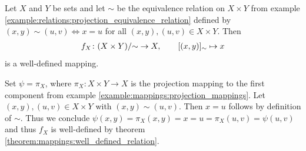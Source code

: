 \begin{examples}
    \begin{exampleenumerate}
        \item Let $X$ and $Y$ be sets and let $\sim$ be the equivalence relation on $X\times Y$ from example \ref{example:relations:projection_equivalence_relation} defined by $(x,y)\sim(u,v)\iff x=u$ for all $(x,y),(u,v)\in X\times Y$. Then
        \begin{align}f_X\colon {(X\times Y)}/{\sim} \rightarrow X,\qquad [(x,y)]_\sim\mapsto x\end{align}
        is a well-defined mapping.
        \begin{miniproof}
            Set $\psi=\pi_X$, where $\pi_X\colon X\times Y \to X$ is the projection mapping to the first component from example \ref{example:mappings:projection_mappings}. Let $(x,y),(u,v)\in X\times Y$ with $(x,y)\sim (u,v)$. Then $x=u$ follows by definition of $\sim$. Thus we conclude $\psi(x,y)=\pi_X(x,y)=x=u=\pi_X(u,v)=\psi(u,v)$ and thus $f_X$ is well-defined by theorem \ref{theorem:mappings:well_defined_relation}.
        \end{miniproof}
    \end{exampleenumerate}
\end{examples}


